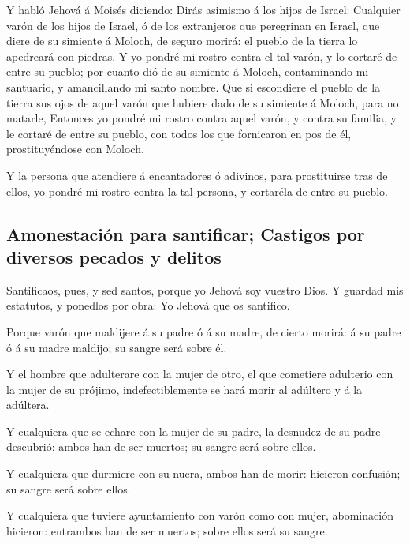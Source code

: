  Y habló Jehová á Moisés diciendo:  Dirás
asimismo á los hijos de Israel: Cualquier varón de los hijos de Israel,
ó de los extranjeros que peregrinan en Israel, que diere de su simiente
á Moloch, de seguro morirá: el pueblo de la tierra lo apedreará con
piedras.  Y yo pondré mi rostro contra el tal varón, y lo
cortaré de entre su pueblo; por cuanto dió de su simiente á Moloch,
contaminando mi santuario, y amancillando mi santo nombre.
 Que si escondiere el pueblo de la tierra sus ojos de
aquel varón que hubiere dado de su simiente á Moloch, para no matarle,
 Entonces yo pondré mi rostro contra aquel varón, y contra
su familia, y le cortaré de entre su pueblo, con todos los que
fornicaron en pos de él, prostituyéndose con Moloch.

 Y la persona que atendiere á encantadores ó adivinos,
para prostituirse tras de ellos, yo pondré mi rostro contra la tal
persona, y cortaréla de entre su pueblo.

\hypertarget{amonestaciuxf3n-para-santificar-castigos-por-diversos-pecados-y-delitos}{%
\subsection{Amonestación para santificar; Castigos por diversos pecados
y
delitos}\label{amonestaciuxf3n-para-santificar-castigos-por-diversos-pecados-y-delitos}}

 Santificaos, pues, y sed santos, porque yo Jehová soy
vuestro Dios.  Y guardad mis estatutos, y ponedlos por
obra: Yo Jehová que os santifico.

 Porque varón que maldijere á su padre ó á su madre, de
cierto morirá: á su padre ó á su madre maldijo; su sangre será sobre él.

 Y el hombre que adulterare con la mujer de otro, el que
cometiere adulterio con la mujer de su prójimo, indefectiblemente se
hará morir al adúltero y á la adúltera.

 Y cualquiera que se echare con la mujer de su padre, la
desnudez de su padre descubrió: ambos han de ser muertos; su sangre será
sobre ellos.

 Y cualquiera que durmiere con su nuera, ambos han de
morir: hicieron confusión; su sangre será sobre ellos.

 Y cualquiera que tuviere ayuntamiento con varón como con
mujer, abominación hicieron: entrambos han de ser muertos; sobre ellos
será su sangre.

